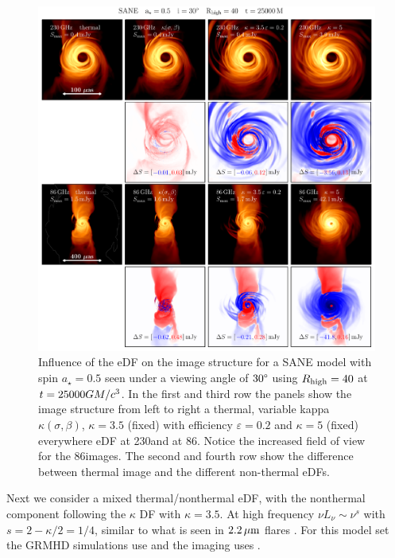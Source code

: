 \begin{figure}
  \centering
  \includegraphics[width=\textwidth]{./figures/SANE_eDFs_diff.pdf}
  \caption{Influence of the eDF on the image structure for a SANE model with spin $a_{\star}=0.5$ seen under a viewing angle of $30\degree$ using $R_\mathrm{high} = 40$ at $t = 25000GM/c^3$.
    In the first and third row the panels show the image structure from left to right a thermal, variable kappa $\kappa(\sigma,\beta)$, $\kappa=3.5$ (fixed) with efficiency $\varepsilon=0.2$ and $\kappa=5$ (fixed) everywhere eDF at 230\GHz and at 86\GHz.
    Notice the increased field of view for the 86\GHz images.
    The second and fourth row show the difference between thermal image and the different non-thermal eDFs.}
  \label{fig:SANE_edfs}
\end{figure}

Next we consider a mixed thermal/nonthermal eDF, with the nonthermal component following the $\kappa$ DF with $\kappa = 3.5$.
At high frequency $\nu L_\nu \sim \nu^s$ with $s = 2 - \kappa/2 = 1/4$, similar to what is seen in $2.2\,\mu\mathrm{m}$ flares \citep{2007ApJ...667..900H}.
For this model set the GRMHD simulations use \bhac and the imaging uses \bhoss.

